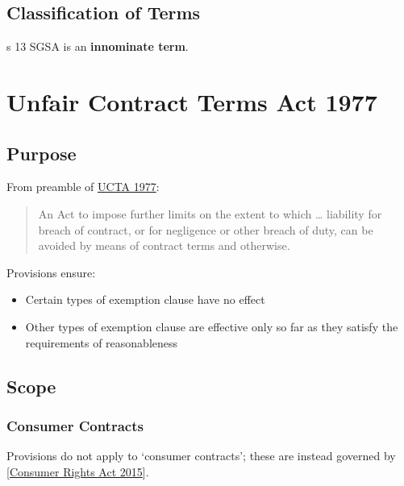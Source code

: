\documentclass[
]{article}
\providecommand{\tightlist}{%
  \setlength{\itemsep}{0pt}\setlength{\parskip}{0pt}}
\begin{document}
\hypertarget{classification-of-terms}{%
\subsection{Classification of Terms}\label{classification-of-terms}}

s 13 SGSA is an \textbf{innominate term}.

\hypertarget{unfair-contract-terms-act-1977}{%
\section{Unfair Contract Terms Act
1977}\label{unfair-contract-terms-act-1977}}

\hypertarget{purpose}{%
\subsection{Purpose}\label{purpose}}

From preamble of
\href{https://www.legislation.gov.uk/ukpga/1977/50/contents}{UCTA 1977}:

\begin{quote}
An Act to impose further limits on the extent to which \ldots{}
liability for breach of contract, or for negligence or other breach of
duty, can be avoided by means of contract terms and otherwise.
\end{quote}

Provisions ensure:

\begin{itemize}
\tightlist
\item
  Certain types of exemption clause have no effect
\item
  Other types of exemption clause are effective only so far as they
  satisfy the requirements of reasonableness
\end{itemize}

\hypertarget{scope}{%
\subsection{Scope}\label{scope}}

\hypertarget{consumer-contracts}{%
\subsubsection{Consumer Contracts}\label{consumer-contracts}}

Provisions do not apply to `consumer contracts'; these are instead
governed by {[}\protect\hyperlink{consumer-rights-act-2015}{Consumer
Rights Act 2015}{]}.
\end{document}
